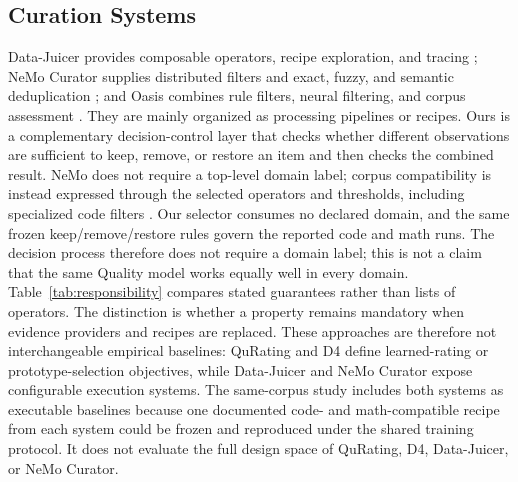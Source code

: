 \documentclass[conference]{IEEEtran}
\begin{document}
\subsection{Curation Systems}
Data-Juicer provides composable operators, recipe exploration, and tracing
\cite{chen2023datajuicer}; NeMo Curator supplies distributed filters and exact,
fuzzy, and semantic deduplication \cite{nvidia2026nemo}; and Oasis combines rule
filters, neural filtering, and corpus assessment \cite{zhou2023oasis}. They are
mainly organized as processing pipelines or recipes. Ours is a complementary
decision-control layer that checks whether different observations are sufficient
to keep, remove, or restore an item and then checks the combined result.
NeMo does not require a top-level domain label; corpus compatibility is instead
expressed through the selected operators and thresholds, including specialized
code filters \cite{nvidia2026nemo,nvidia2026filtering}. Our selector consumes no
declared domain, and the same frozen keep/remove/restore rules govern the reported
code and math runs. The decision process therefore does not require a domain label;
this is not a claim that the same Quality model works equally well in every domain.
Table~\ref{tab:responsibility} compares stated guarantees rather than lists of
operators. The distinction is whether a property remains mandatory when
evidence providers and recipes are replaced.
These approaches are therefore not interchangeable empirical baselines:
QuRating and D4 define learned-rating or prototype-selection objectives, while
Data-Juicer and NeMo Curator expose configurable execution systems. The
same-corpus study includes both systems as executable baselines because one
documented code- and math-compatible recipe from each system could be frozen
and reproduced under the shared training protocol. It does not evaluate the full
design space of QuRating, D4, Data-Juicer, or NeMo Curator.
\end{document}
